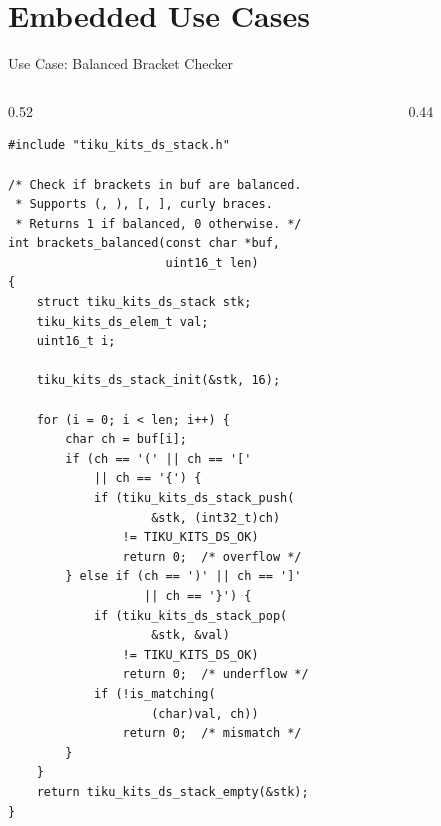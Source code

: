 \documentclass[aspectratio=169, 10pt]{beamer}
\begin{document}
\section{Embedded Use Cases}

\begin{frame}[fragile]{Use Case: Balanced Bracket Checker}
\begin{columns}[T]
\begin{column}{0.52\textwidth}
\begin{lstlisting}[style=cstyle,
  title={Validate bracket pairs in a protocol string}]
#include "tiku_kits_ds_stack.h"

/* Check if brackets in buf are balanced.
 * Supports (, ), [, ], curly braces.
 * Returns 1 if balanced, 0 otherwise. */
int brackets_balanced(const char *buf,
                      uint16_t len)
{
    struct tiku_kits_ds_stack stk;
    tiku_kits_ds_elem_t val;
    uint16_t i;

    tiku_kits_ds_stack_init(&stk, 16);

    for (i = 0; i < len; i++) {
        char ch = buf[i];
        if (ch == '(' || ch == '['
            || ch == '{') {
            if (tiku_kits_ds_stack_push(
                    &stk, (int32_t)ch)
                != TIKU_KITS_DS_OK)
                return 0;  /* overflow */
        } else if (ch == ')' || ch == ']'
                   || ch == '}') {
            if (tiku_kits_ds_stack_pop(
                    &stk, &val)
                != TIKU_KITS_DS_OK)
                return 0;  /* underflow */
            if (!is_matching(
                    (char)val, ch))
                return 0;  /* mismatch */
        }
    }
    return tiku_kits_ds_stack_empty(&stk);
}
\end{lstlisting}
\end{column}

\begin{column}{0.44\textwidth}
\begin{center}
\end{center}
\end{column}
\end{columns}
\end{frame}
\end{document}
